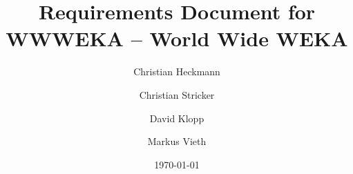 \documentclass{book}
\title{Requirements Document for \\
WWWEKA -- World Wide WEKA} %
\author{Christian Heckmann \and Christian Stricker \and David Klopp \and Markus Vieth}
\date{\today}
\begin{document}

\maketitle


\printglossaries

\tableofcontents




\end{document}
